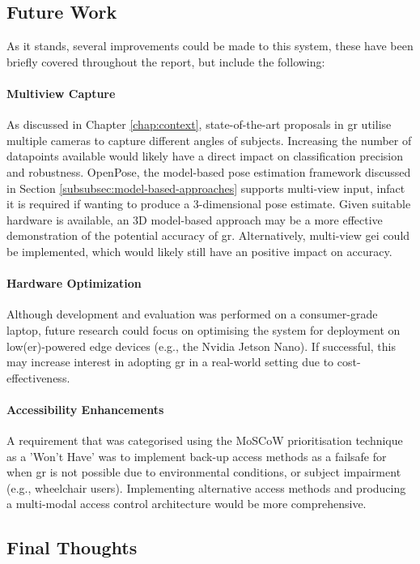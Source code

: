 \subsection{Future Work}

As it stands, several improvements could be made to this system, these have been briefly covered throughout the report, but include the following:

\paragraph{Multiview Capture} As discussed in Chapter \ref{chap:context}, state-of-the-art proposals in \ac{gr} utilise multiple cameras to capture different angles of subjects. 
Increasing the number of datapoints available would likely have a direct impact on classification precision and robustness.
OpenPose, the model-based pose estimation framework discussed in Section \ref{subsubsec:model-based-approaches} supports multi-view input, infact it is required if wanting to produce a 3-dimensional pose estimate.
Given suitable hardware is available, an 3D model-based approach may be a more effective demonstration of the potential accuracy of \ac{gr}.
Alternatively, multi-view \ac{gei} could be implemented, which would likely still have an positive impact on accuracy.

\paragraph{Hardware Optimization} Although development and evaluation was performed on a consumer-grade laptop, future research could focus on optimising the system for deployment on low(er)-powered edge devices (e.g., the Nvidia Jetson Nano). If successful, this may increase interest in adopting \ac{gr} in a real-world setting due to cost-effectiveness.

\paragraph{Accessibility Enhancements} A requirement that was categorised using the MoSCoW prioritisation technique as a 'Won't Have' was to implement back-up access methods as a failsafe for when \ac{gr} is not possible due to environmental conditions, or subject impairment (e.g., wheelchair users).
Implementing alternative access methods and producing a multi-modal access control architecture would be more comprehensive.

\subsection{Final Thoughts}

